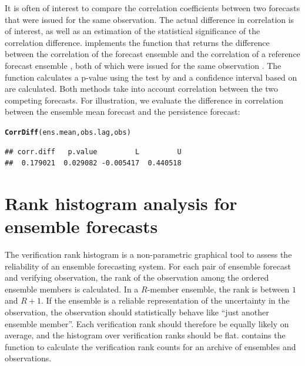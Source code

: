 \documentclass[article]{jss}\usepackage{graphicx, color}
\makeatletter
\newcommand{\hlfunctioncall}[1]{\textcolor[rgb]{0,0.501960784313725,0.752941176470588}{\textbf{#1}}}%
\newenvironment{kframe}{%
 \def\at@end@of@kframe{}%
 \ifinner\ifhmode%
  \def\at@end@of@kframe{\end{minipage}}%
  \begin{minipage}{\columnwidth}%
 \fi\fi%
 \def\FrameCommand##1{\hskip\@totalleftmargin \hskip-\fboxsep
 \colorbox{shadecolor}{##1}\hskip-\fboxsep
     \hskip-\linewidth \hskip-\@totalleftmargin \hskip\columnwidth}%
 \MakeFramed {\advance\hsize-\width
   \@totalleftmargin\z@ \linewidth\hsize
   \@setminipage}}%
 {\par\unskip\endMakeFramed%
 \at@end@of@kframe}
\newenvironment{knitrout}{}{} %
\makeatother
\begin{document}
It is often of interest to compare the correlation coefficients between two forecasts that were issued for the same observation.
The actual difference in correlation is of interest, as well as an estimation of the statistical significance of the correlation difference.
 implements the function  that returns the difference between the correlation of the forecast ensemble  and the correlation of a reference forecast ensemble , both of which were issued for the same observation .
The function calculates a p-value using the test by \citet{steiger1980tests} and a confidence interval based on \citet{zou2007toward} are calculated.
Both methods take into account correlation between the two competing forecasts.
For illustration, we evaluate the difference in correlation between the ensemble mean forecast and the persistence forecast:


\begin{knitrout}
\color{fgcolor}\begin{kframe}
\begin{alltt}
\hlfunctioncall{CorrDiff}(ens.mean, obs.lag, obs)
\end{alltt}
\begin{verbatim}
## corr.diff   p.value         L         U 
##  0.179021  0.029082 -0.005417  0.440518
\end{verbatim}
\end{kframe}
\end{knitrout}





\section{Rank histogram analysis for ensemble forecasts}

The verification rank histogram \citep{hamill2001interpretation} is a non-parametric graphical tool to assess the reliability of an ensemble forecasting system.
For each pair of ensemble forecast and verifying observation, the rank of the observation among the ordered ensemble members is calculated.
In a $R$-member ensemble, the rank is between $1$ and $R+1$.
If the ensemble is a reliable representation of the uncertainty in the observation, the observation should statistically behave like ``just another ensemble member''. 
Each verification rank should therefore be equally likely on average, and the histogram over verification ranks should be flat. 
 contains the function  to calculate the verification rank counts for an archive of ensembles and observations.
\end{document}
